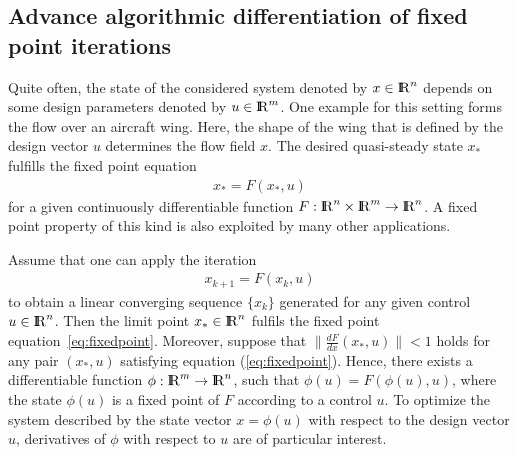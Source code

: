 \documentclass[11pt,twoside]{article}
\newcommand{\R}{{ {\rm I} \kern -.225em {\rm R} }}
\begin{document}
\subsection{Advance algorithmic differentiation of fixed point iterations}
%
Quite often, the state of the considered system denoted by $x\in\R^n$
depends on some design parameters denoted by $u\in\R^m$. One example for this setting
forms the flow over an aircraft wing. Here, the shape of the wing that
is defined by the design vector $u$  
determines the flow field $x$. The desired quasi-steady state $x_*$
fulfills the fixed point equation
\begin{align}
  \label{eq:fixedpoint}
  x_* = F(x_*,u)
\end{align}
for a given continuously differentiable function 
$F:\R^n\times\R^m\rightarrow\R^n$. A fixed point property of this kind is
also exploited by many other applications.

Assume that one can apply the iteration  
\begin{align}
\label{eq:iteration}
 x_{k+1} = F(x_k,u)
\end{align}
to obtain a linear converging sequence $\{x_k\}$ generated
for any given control $u\in\R^n$. Then the limit point $x_*\in\R^n$ fulfils the fixed
point equation~\eqref{eq:fixedpoint}. Moreover,
suppose that $\|\frac{dF}{dx}(x_*,u)\|<1$ holds for any pair
$(x_*,u)$ satisfying equation (\ref{eq:fixedpoint}).
Hence, there exists a
differentiable function $\phi:\R^m \rightarrow \R^n$,
such that $\phi(u) = F(\phi(u),u)$, where the state 
$\phi(u)$ is a fixed point of $F$ according to a control
$u$. To optimize the system described by the state vector $x=\phi(u)$ with respect to
the design vector $u$, derivatives of $\phi$ with respect
to $u$ are of particular interest.
\end{document}
